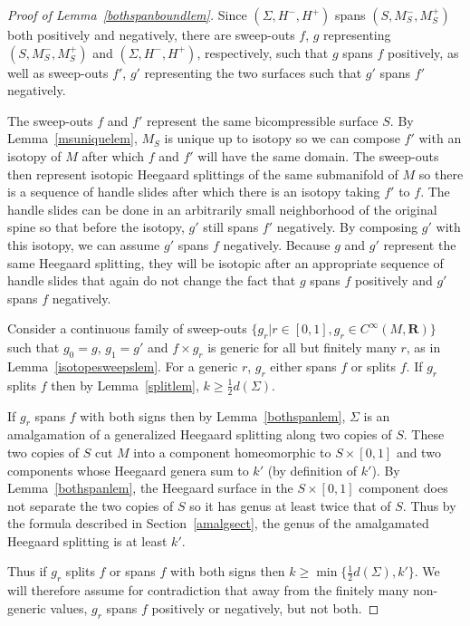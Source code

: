 \documentclass[12pt]{amsart}
\theoremstyle{plain}
\theoremstyle{definition}
\begin{document}
\begin{proof}[Proof of Lemma~\ref{bothspanboundlem}]
Since $(\Sigma, H^-, H^+)$ spans $(S, M_S^-, M_S^+)$ both positively and negatively, there are sweep-outs $f$, $g$ representing $(S, M_S^-, M_S^+)$ and $(\Sigma, H^-, H^+)$, respectively, such that $g$ spans $f$ positively, as well as sweep-outs $f'$, $g'$ representing the two surfaces such that $g'$ spans $f'$ negatively.  

The sweep-outs $f$ and $f'$ represent the same bicompressible surface $S$.  By Lemma~\ref{msuniquelem}, $M_S$ is unique up to isotopy so we can compose $f'$ with an isotopy of $M$ after which $f$ and $f'$ will have the same domain.  The sweep-outs then represent isotopic Heegaard splittings of the same submanifold of $M$ so there is a sequence of handle slides after which there is an isotopy taking $f'$ to $f$.  The handle slides can be done in an arbitrarily small neighborhood of the original spine so that before the isotopy, $g'$ still spans $f'$ negatively.  By composing $g'$ with this isotopy, we can assume $g'$ spans $f$ negatively.  Because $g$ and $g'$ represent the same Heegaard splitting, they will be isotopic after an appropriate sequence of handle slides that again do not change the fact that $g$ spans $f$ positively and $g'$ spans $f$ negatively.

Consider a continuous family of sweep-outs $\{g_r |  r \in [0,1], g_r \in C^{\infty}(M,\mathbf{R})\}$ such that $g_0 = g$, $g_1 = g'$ and $f \times g_r$ is generic for all but finitely many $r$, as in Lemma~\ref{isotopesweepslem}.  For a generic $r$, $g_r$ either spans $f$ or splits $f$.  If $g_r$ splits $f$ then by Lemma~\ref{splitlem}, $k \geq \frac{1}{2} d(\Sigma)$.    

If $g_r$ spans $f$ with both signs then by Lemma~\ref{bothspanlem}, $\Sigma$ is an amalgamation of a generalized Heegaard splitting along two copies of $S$.  These two copies of $S$ cut $M$ into a component homeomorphic to $S \times [0,1]$ and two components whose Heegaard genera sum to $k'$ (by definition of $k'$).  By  Lemma~\ref{bothspanlem}, the Heegaard surface in the $S \times [0,1]$ component does not separate the two copies of $S$ so it has genus at least twice that of $S$. Thus by the formula described in Section~\ref{amalgsect}, the genus of the amalgamated Heegaard splitting is at least $k'$.  

Thus if $g_r$ splits $f$ or spans $f$ with both signs then $k \geq \min\{\frac{1}{2}d(\Sigma),k'\}$.  We will therefore assume for contradiction that away from the finitely many non-generic values, $g_r$ spans $f$ positively or negatively, but not both.


\end{proof}
\end{document}
